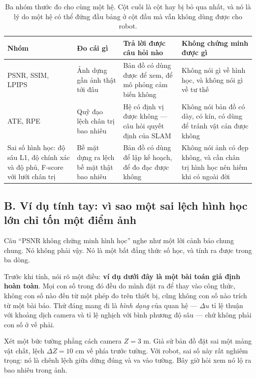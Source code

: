 \documentclass[../../deep_learning.tex]{subfiles}
\begin{document}
\begin{table}[H]\centering\footnotesize
\caption{Ba nhóm thước đo cho cùng một hệ. Cột cuối là cột hay bị bỏ qua nhất, và nó là lý do một hệ có thể đứng đầu bảng ở cột đầu mà vẫn không dùng được cho robot.}
\label{tab:f32-metrics}
\begin{tabularx}{\linewidth}{@{}L{2.5cm}L{3.0cm}YL{3.9cm}@{}}
\toprule
\textbf{Nhóm} & \textbf{Đo cái gì} & \textbf{Trả lời được câu hỏi nào} & \textbf{Không chứng minh được gì}\\
\midrule
PSNR, SSIM, LPIPS & Ảnh dựng gần ảnh thật tới đâu & Bản đồ có dùng được để xem, để mô phỏng cảm biến không & Không nói gì về hình học, và không nói gì về tư thế\\
ATE, RPE & Quỹ đạo lệch chân trị bao nhiêu & Hệ có định vị được không --- câu hỏi quyết định của SLAM & Không nói bản đồ có dày, có kín, có dùng để tránh vật cản được không\\
Sai số hình học: độ sâu L1, độ chính xác và độ phủ, F-score với lưới chân trị & Bề mặt dựng ra lệch bề mặt thật bao nhiêu & Bản đồ có dùng để lập kế hoạch, để đo đạc được không & Không nói ảnh có đẹp không, và cần chân trị hình học nên hiếm khi có ngoài đời\\
\bottomrule
\end{tabularx}
\end{table}

\subsection{B. Ví dụ tính tay: vì sao một sai lệch hình học lớn chỉ tốn một điểm ảnh}
Câu ``PSNR không chứng minh hình học'' nghe như một lời cảnh báo chung chung. Nó không phải vậy. Nó là một bất đẳng thức số học, và tính ra được trong ba dòng.

Trước khi tính, nói rõ một điều: \textbf{ví dụ dưới đây là một bài toán giả định hoàn toàn}. Mọi con số trong đó đều do mình đặt ra để thay vào công thức, không con số nào đến từ một phép đo trên thiết bị, cũng không con số nào trích từ một bài báo. Thứ đáng mang đi là \emph{hình dạng} của quan hệ --- \(\Delta u\) tỉ lệ thuận với khoảng dịch camera và tỉ lệ nghịch với bình phương độ sâu --- chứ không phải con số ở vế phải.

Xét một bức tường phẳng cách camera \(Z = 3\) m. Giả sử bản đồ đặt sai một mảng vật chất, lệch \(\Delta Z = 10\) cm về phía trước tường. Với robot, sai số này rất nghiêm trọng: nó là chênh lệch giữa dừng đúng và va vào tường. Bây giờ hỏi xem nó lộ ra bao nhiêu trong ảnh.
\end{document}
